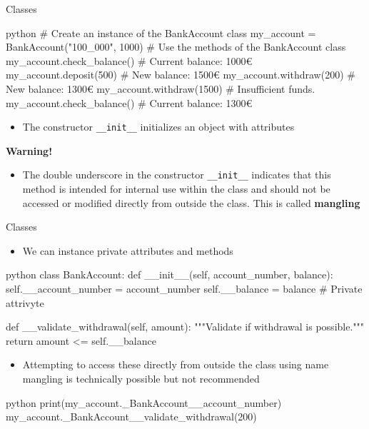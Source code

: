 \documentclass[
	11pt, 
]{beamer}
\begin{document}

\begin{frame}[fragile]{Classes}
\begin{mintedbox}{python}
# Create an instance of the BankAccount class
my_account = BankAccount("100_000", 1000)
# Use the methods of the BankAccount class
my_account.check_balance()  # Current balance: 1000€
my_account.deposit(500)     # New balance: 1500€
my_account.withdraw(200)    # New balance: 1300€
my_account.withdraw(1500)   # Insufficient funds. 
my_account.check_balance()  # Current balance: 1300€
\end{mintedbox}

\begin{itemize}
    \item The constructor \texttt{\_\_init\_\_} initializes an object with attributes
\end{itemize}

\begin{alertblock}{\textbf{Warning!}}
    \begin{itemize}
        \item The double underscore in the constructor \texttt{\_\_init\_\_} indicates that this method is intended for internal use within the class and should not be accessed or modified directly from outside the class. This is called \textbf{mangling}
    \end{itemize}
\end{alertblock}

\end{frame}


\begin{frame}[fragile]{Classes}

\begin{itemize}
    \item We can instance private attributes and methods
\end{itemize}
\begin{mintedbox}{python}
class BankAccount:
    def __init__(self, account_number, balance):
        self.__account_number = account_number  
        self.__balance = balance # Private attrivyte             

    def __validate_withdrawal(self, amount): 
        """Validate if withdrawal is possible."""
        return amount <= self.__balance
\end{mintedbox}

\begin{itemize}
    \item Attempting to access these directly from outside the class using name mangling is technically possible but not recommended
\end{itemize}

\begin{mintedbox}{python}
print(my_account._BankAccount__account_number) 
my_account._BankAccount__validate_withdrawal(200)
\end{mintedbox}

\end{frame}
\end{document}
